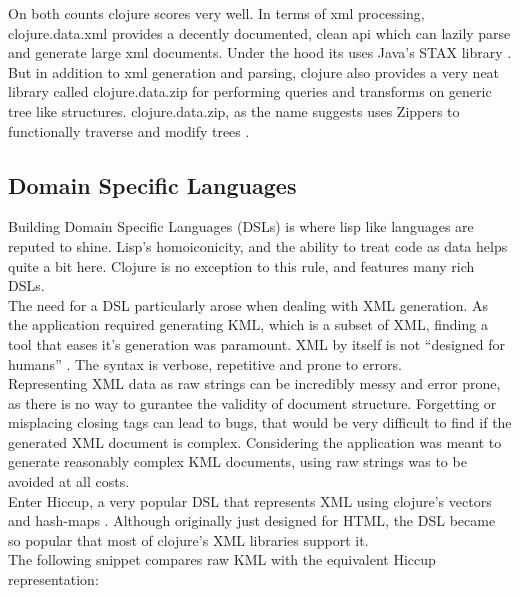 On both counts clojure scores very well. In terms of xml processing, clojure.data.xml provides  a decently documented, clean api which can lazily parse and generate large xml documents. Under the hood its uses Java's STAX library \citep{clojure:data.xml}.\\

But in addition to xml generation and parsing, clojure also provides a very neat library called clojure.data.zip for performing queries and transforms on generic tree like structures. clojure.data.zip, as the name suggests uses Zippers to functionally traverse and modify trees \citep{clojure:data.zip}.\\


\subsection{Domain Specific Languages}

Building Domain Specific Languages (DSLs) is where lisp like languages are reputed to shine. Lisp's homoiconicity, and the ability to treat code as data helps quite a bit here. Clojure is no exception to this rule, and features many rich DSLs.\\

The need for a DSL particularly arose when dealing with XML generation. As the application required generating KML, which is a subset of XML, finding a tool that eases it's generation was paramount. XML by itself is not ``designed for humans'' \citep{ch:xml}. The syntax is verbose, repetitive and prone to errors.\\

Representing XML data as raw strings can be incredibly messy and error prone, as there is no way to gurantee the validity of document structure. Forgetting or misplacing closing tags can lead to bugs, that would be very difficult to find if the generated XML document is complex. Considering the application was meant to generate reasonably complex KML documents, using raw strings was to be avoided at all costs.\\

Enter Hiccup, a very popular DSL that represents XML using clojure's vectors and hash-maps \citep{clj:hiccup}. Although originally just designed for HTML, the DSL became so popular that most of clojure's XML libraries support it. \\

The following snippet compares raw KML with the equivalent Hiccup representation:\\

